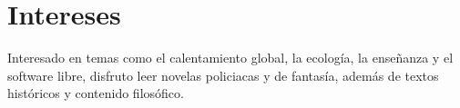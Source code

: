 \documentclass[letterpaper]{twentysecondcv} %
\begin{document}







\makeprofile %


\section{Intereses}

Interesado en temas como el calentamiento global, la ecología, la enseñanza y el software libre, disfruto leer novelas policiacas y de fantasía, además de textos históricos y contenido filosófico.

\end{document}
